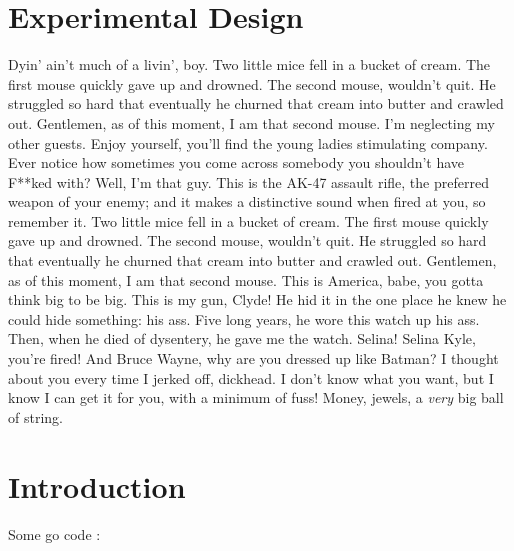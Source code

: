 \chapter{Experimental Design}\label{experimental-design}

Dyin' ain't much of a livin', boy. Two little mice fell in a bucket of
cream. The first mouse quickly gave up and drowned. The second mouse,
wouldn't quit. He struggled so hard that eventually he churned that
cream into butter and crawled out. Gentlemen, as of this moment, I am
that second mouse. I'm neglecting my other guests. Enjoy yourself,
you'll find the young ladies stimulating company. Ever notice how
sometimes you come across somebody you shouldn't have F**ked with? Well,
I'm that guy. This is the AK-47 assault rifle, the preferred weapon of
your enemy; and it makes a distinctive sound when fired at you, so
remember it. Two little mice fell in a bucket of cream. The first mouse
quickly gave up and drowned. The second mouse, wouldn't quit. He
struggled so hard that eventually he churned that cream into butter and
crawled out. Gentlemen, as of this moment, I am that second mouse. This
is America, babe, you gotta think big to be big. This is my gun, Clyde!
He hid it in the one place he knew he could hide something: his ass.
Five long years, he wore this watch up his ass. Then, when he died of
dysentery, he gave me the watch. Selina! Selina Kyle, you're fired! And
Bruce Wayne, why are you dressed up like Batman? I thought about you
every time I jerked off, dickhead. I don't know what you want, but I
know I can get it for you, with a minimum of fuss! Money, jewels, a
\emph{very} big ball of string.

\chapter{Introduction}\label{introduction}

Some go code \cite{placeholder}:

\begin{Shaded}
\begin{Highlighting}[]
 \NormalTok{(} 

 
     
\NormalTok{\}}

  
     \NormalTok{\{}
         
    \NormalTok{\}}
\NormalTok{\}}
\end{Highlighting}
\end{Shaded}

